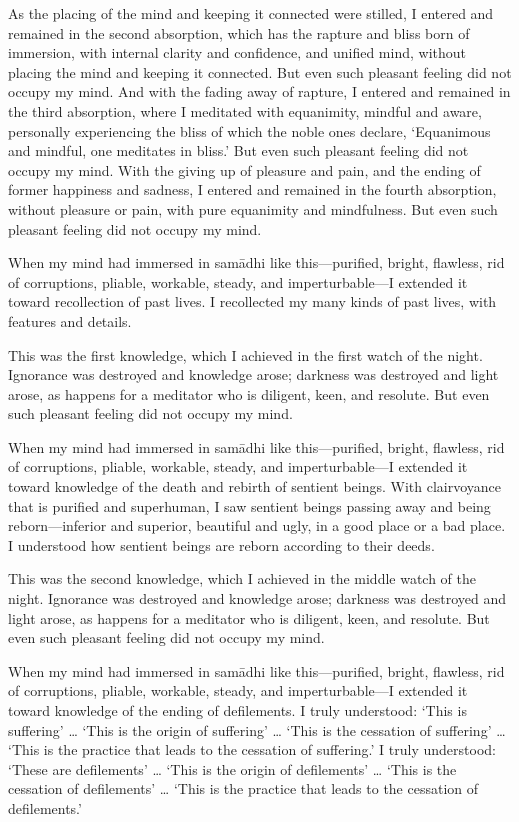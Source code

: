 \documentclass[12pt,openany]{book}%
\begin{document}
As the placing of the mind and keeping it connected were stilled, I entered and remained in the second absorption, which has the rapture and bliss born of immersion, with internal clarity and confidence, and unified mind, without placing the mind and keeping it connected. But even such pleasant feeling did not occupy my mind. And with the fading away of rapture, I entered and remained in the third absorption, where I meditated with equanimity, mindful and aware, personally experiencing the bliss of which the noble ones declare, ‘Equanimous and mindful, one meditates in bliss.’ But even such pleasant feeling did not occupy my mind. With the giving up of pleasure and pain, and the ending of former happiness and sadness, I entered and remained in the fourth absorption, without pleasure or pain, with pure equanimity and mindfulness. But even such pleasant feeling did not occupy my mind. 

When my mind had immersed in \textsanskrit{samādhi} like this—purified, bright, flawless, rid of corruptions, pliable, workable, steady, and imperturbable—I extended it toward recollection of past lives. I recollected my many kinds of past lives, with features and details. 

This was the first knowledge, which I achieved in the first watch of the night. Ignorance was destroyed and knowledge arose; darkness was destroyed and light arose, as happens for a meditator who is diligent, keen, and resolute. But even such pleasant feeling did not occupy my mind. 

When my mind had immersed in \textsanskrit{samādhi} like this—purified, bright, flawless, rid of corruptions, pliable, workable, steady, and imperturbable—I extended it toward knowledge of the death and rebirth of sentient beings. With clairvoyance that is purified and superhuman, I saw sentient beings passing away and being reborn—inferior and superior, beautiful and ugly, in a good place or a bad place. I understood how sentient beings are reborn according to their deeds. 

This was the second knowledge, which I achieved in the middle watch of the night. Ignorance was destroyed and knowledge arose; darkness was destroyed and light arose, as happens for a meditator who is diligent, keen, and resolute. But even such pleasant feeling did not occupy my mind. 

When my mind had immersed in \textsanskrit{samādhi} like this—purified, bright, flawless, rid of corruptions, pliable, workable, steady, and imperturbable—I extended it toward knowledge of the ending of defilements. I truly understood: ‘This is suffering’ … ‘This is the origin of suffering’ … ‘This is the cessation of suffering’ … ‘This is the practice that leads to the cessation of suffering.’ I truly understood: ‘These are defilements’ … ‘This is the origin of defilements’ … ‘This is the cessation of defilements’ … ‘This is the practice that leads to the cessation of defilements.’ 
\end{document}
